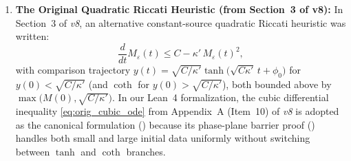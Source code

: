 \documentclass[11pt,a4paper]{article}
\theoremstyle{plain}
\theoremstyle{definition}
\theoremstyle{remark}
\begin{document}
\begin{enumerate}
\item \textbf{The Original Quadratic Riccati Heuristic (from Section~3 of v8):}
In Section~3 of \emph{v8}, an alternative constant-source quadratic Riccati heuristic was written:
\begin{equation}\label{eq:orig_quad_riccati}
\frac{d}{dt}M_\varepsilon(t) \le C - \kappa'\,M_\varepsilon(t)^2,
\end{equation}
with comparison trajectory $y(t)=\sqrt{C/\kappa'}\tanh\bigl(\sqrt{C\kappa'}\,t+\phi_0\bigr)$ for $y(0)<\sqrt{C/\kappa'}$ (and $\coth$ for $y(0)>\sqrt{C/\kappa'}$), both bounded above by $\max\bigl(M(0),\sqrt{C/\kappa'}\bigr)$. In our Lean~4 formalization, the cubic differential inequality \eqref{eq:orig_cubic_ode} from Appendix~A (Item~10) of \emph{v8} is adopted as the canonical formulation () because its phase-plane barrier proof () handles both small and large initial data uniformly without switching between $\tanh$ and $\coth$ branches.
\end{enumerate}
\end{document}
